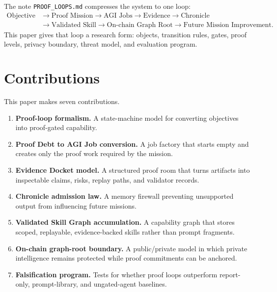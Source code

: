 \documentclass[11pt]{article}
\newcommand{\doccode}[1]{\texttt{#1}}
\begin{document}
The note \doccode{PROOF\_LOOPS.md} compresses the system to one loop:
\[
\begin{aligned}
\text{Objective} &\rightarrow \text{Proof Mission} \rightarrow \text{AGI Jobs} \rightarrow \text{Evidence} \rightarrow \text{Chronicle}\\
&\rightarrow \text{Validated Skill} \rightarrow \text{On-chain Graph Root} \rightarrow \text{Future Mission Improvement}.
\end{aligned}
\]
This paper gives that loop a research form: objects, transition rules, gates, proof levels, privacy boundary, threat model, and evaluation program.

\section{Contributions}
This paper makes seven contributions.
\begin{enumerate}
  \item \textbf{Proof-loop formalism.} A state-machine model for converting objectives into proof-gated capability.
  \item \textbf{Proof Debt to AGI Job conversion.} A job factory that starts empty and creates only the proof work required by the mission.
  \item \textbf{Evidence Docket model.} A structured proof room that turns artifacts into inspectable claims, risks, replay paths, and validator records.
  \item \textbf{Chronicle admission law.} A memory firewall preventing unsupported output from influencing future missions.
  \item \textbf{Validated Skill Graph accumulation.} A capability graph that stores scoped, replayable, evidence-backed skills rather than prompt fragments.
  \item \textbf{On-chain graph-root boundary.} A public/private model in which private intelligence remains protected while proof commitments can be anchored.
  \item \textbf{Falsification program.} Tests for whether proof loops outperform report-only, prompt-library, and ungated-agent baselines.
\end{enumerate}
\end{document}
